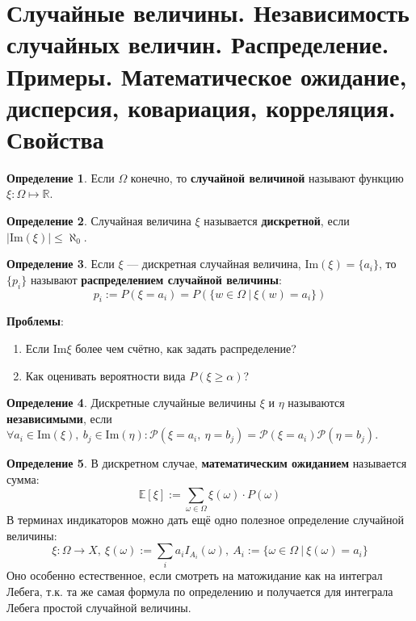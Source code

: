 \documentclass[11pt,a4paper]{report}
\def\E{\mathbb{E}}
\def\prob{\mathcal{P}}
\theoremstyle{definition}
\theoremstyle{definition}
\theoremstyle{definition}
\newtheorem{definition}{Определение}[section]
\begin{document}
	\section{Случайные величины. Независимость случайных величин. Распределение. Примеры. Математическое ожидание, дисперсия, ковариация, корреляция. Свойства}
		\begin{definition}
			Если $ \Omega $ конечно, то \textbf{случайной величиной} называют функцию $\xi: \Omega \mapsto \mathbb{R} $.
		\end{definition}
		\begin{definition}
			Случайная величина $ \xi $ называется \textbf{дискретной}, если $ |\mbox{Im}(\xi)| \le \aleph_{0} $.
		\end{definition}
		\begin{definition}
			Если $ \xi $ — дискретная случайная величина, $ \mbox{Im}(\xi) = \{a_{i}\} $, то $ \{p_{i}\} $ называют \textbf{распределением случайной величины}: 
			\[ p_{i} := P(\xi = a_{i}) = P(\{w \in \Omega\ |\ \xi(w) = a_{i} \}) \]
		\end{definition}
		\noindent\textbf{Проблемы}:
		\begin{enumerate}
			\item Если $ \mbox{Im} \xi $ более чем счётно, как задать распределение?
			\item Как оценивать вероятности вида $ P(\xi \ge \alpha) $?
		\end{enumerate}
		\begin{definition}
			Дискретные случайные величины $ \xi $ и $ \eta $ называются \textbf{независимыми}, если $ \forall a_{i} \in \mbox{Im}(\xi),\ b_{j} \in \mbox{Im}(\eta): \prob(\xi = a_{i},\ \eta = b_{j}) = \prob(\xi = a_{i}) \prob(\eta = b_{j}) $.
		\end{definition}
		\begin{definition}
			В дискретном случае, \textbf{математическим ожиданием} называется сумма: 
			\[\E[\xi] := \sum_{\omega \in \Omega}{\xi(\omega) \cdot P(\omega)} \]
			В терминах индикаторов можно дать ещё одно полезное определение случайной величины:\\
			\[ \xi: \Omega \to X,\ \xi(\omega) := \sum_{i} a_{i} I_{A_{i}}(\omega),\ A_{i} := \{\omega \in \Omega\ |\ \xi(\omega) = a_{i} \} \]
			Оно особенно естественное, если смотреть на матожидание как на интеграл Лебега, т.к. та же самая формула по определению и получается для интеграла Лебега простой случайной величины.
		\end{definition}
\end{document}
